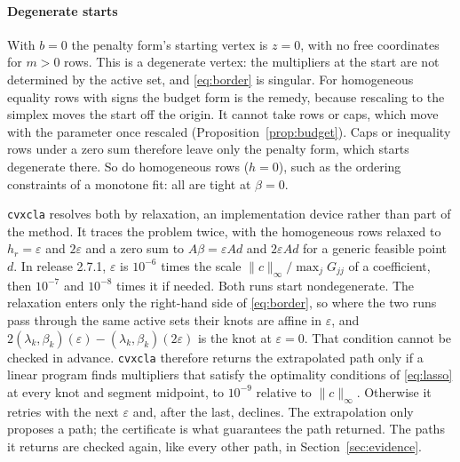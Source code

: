 \documentclass[11pt]{article}
\theoremstyle{remark}
\begin{document}
\paragraph{Degenerate starts} With $b=0$ the penalty form's starting vertex is $z=0$,
with no free coordinates for $m>0$ rows. This is a degenerate vertex: the multipliers at
the start are not determined by the active set, and \eqref{eq:border} is singular. For
homogeneous equality rows with signs the budget form is the remedy, because rescaling to
the simplex moves the start off the origin. It cannot take rows or caps, which move with
the parameter once rescaled (Proposition~\ref{prop:budget}). Caps or inequality rows
under a zero sum therefore leave only the penalty form, which starts degenerate there. So do
homogeneous rows ($h=0$), such as the ordering constraints of a monotone fit: all are
tight at $\beta=0$.

\texttt{cvxcla} resolves both by relaxation, an implementation device rather than part
of the method. It traces the problem twice, with the homogeneous rows relaxed to
$h_r=\varepsilon$ and $2\varepsilon$ and a zero sum to $A\beta=\varepsilon Ad$ and
$2\varepsilon Ad$ for a generic feasible point $d$. In release 2.7.1, $\varepsilon$ is
$10^{-6}$ times the scale $\|c\|_\infty/\max_jG_{jj}$ of a coefficient, then $10^{-7}$ and
$10^{-8}$ times it if needed. Both runs start nondegenerate. The relaxation enters only the right-hand side of
\eqref{eq:border}, so where the two runs pass through the same active sets their knots
are affine in $\varepsilon$, and
$2(\lambda_k,\beta_k)(\varepsilon)-(\lambda_k,\beta_k)(2\varepsilon)$ is the knot at
$\varepsilon=0$. That condition cannot be checked in advance. \texttt{cvxcla} therefore
returns the extrapolated path only if a linear program finds multipliers that satisfy
the optimality conditions of \eqref{eq:lasso} at every knot and segment midpoint, to
$10^{-9}$ relative to $\|c\|_\infty$. Otherwise it retries with the next $\varepsilon$
and, after the last, declines. The extrapolation only proposes a path; the certificate
is what guarantees the path returned. The paths it returns are checked again, like every
other path, in Section~\ref{sec:evidence}.
\end{document}
